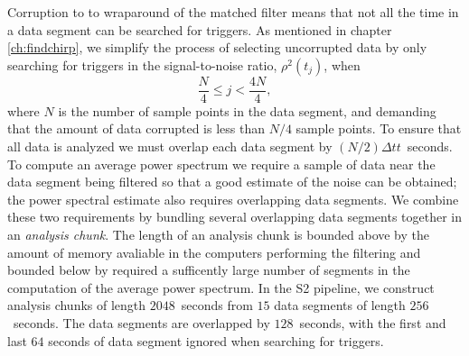 Corruption to to wraparound of the matched filter means that not all the time
in a data segment can be searched for triggers. As mentioned in chapter
\ref{ch:findchirp}, we simplify the process of selecting uncorrupted data by
only searching for triggers in the signal-to-noise ratio, $\rho^2(t_j)$, when 
\begin{equation}
\frac{N}{4} \le j < \frac{4N}{4},
\end{equation}
where $N$ is the number of sample points in the data segment, and demanding
that the amount of data corrupted is less than $N/4$ sample points. To ensure
that all data is analyzed we must overlap each data segment by $(N/2)\Delta t
t$~seconds. To compute an average power spectrum we require a sample of data
near the data segment being filtered so that a good estimate of the noise can
be obtained; the power spectral estimate also requires overlapping data
segments. We combine these two requirements by bundling several overlapping
data segments together in an \emph{analysis chunk}. The length of an analysis
chunk is bounded above by the amount of memory avaliable in the computers
performing the filtering and bounded below by required a sufficently large
number of segments in the computation of the average power spectrum. In the S2
pipeline, we construct analysis chunks of length $2048$~seconds from $15$ data
segments of length $256$~seconds. The data segments are overlapped by
$128$~seconds, with the first and last $64$ seconds of data segment ignored
when searching for triggers. 

